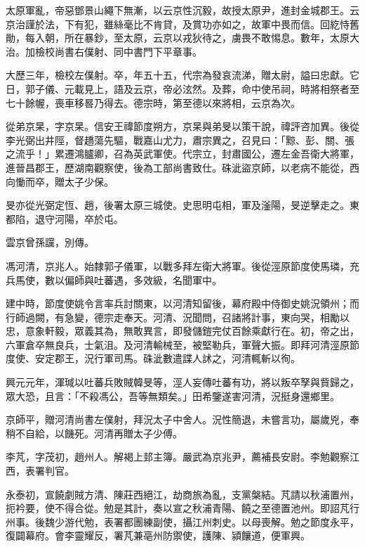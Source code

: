 \begin{pinyinscope}
 太原軍亂，帝惡鄧景山繩下無漸，以云京性沉毅，故授太原尹，進封金城郡王。云京治謹於法，下有犯，雖絲毫比不肯貸，及賞功亦如之，故軍中畏而信。回紇恃舊勛，每入朝，所在暴鈔，至太原，云京以戎狄待之，虜畏不敢惕息。數年，太原大治。加檢校尚書右僕射、同中書門下平章事。



 大歷三年，檢校左僕射。卒，年五十五，代宗為發哀流涕，贈太尉，謚曰忠獻。它日，郭子儀、元載見上，語及云京，帝必泫然。及葬，命中使吊祠，時將相祭者至七十餘幄，喪車移晷乃得去。德宗時，第至德以來將相，云京為次。



 從弟京杲，字京杲。信安王禕節度朔方，京杲與弟旻以策干說，禕評咨加異。後從李光弼出井陘，督趫蕩先驅，戰嘉山尤力，肅宗異之，召見曰：「黥、彭、關、張之流乎！」累遷鴻臚卿，召為英武軍使。代宗立，封肅國公，遷左金吾衛大將軍，進晉昌郡王，歷湖南觀察使，後為工部尚書致仕。硃泚盜京師，以老病不能從，西向慟而卒，贈太子少保。



 旻亦從光弼定恆、趙，後署太原三城使。史思明屯相，軍及滏陽，旻逆擊走之。東都陷，退守河陽，卒於屯。



 雲京曾孫讜，別傳。



 馮河清，京兆人。始隸郭子儀軍，以戰多拜左衛大將軍。後從涇原節度使馬璘，充兵馬使，數以偏師與吐蕃遇，多效級，名聞軍中。



 建中時，節度使姚令言率兵討關東，以河清知留後，幕府殿中侍御史姚況領州；而行師過闕，有急變，德宗走奉天。河清、況聞問，召諸將計事，東向哭，相勵以忠，意象軒毅，眾義其為，無敢異言，即發儲鎧完仗百餘乘獻行在。初，帝之出，六軍倉卒無良兵，士氣沮。及河清輸械至，被堅勒兵，軍聲大振。即拜河清涇原節度使、安定郡王，況行軍司馬。硃泚數遣諜人訹之，河清輒斬以徇。



 興元元年，渾瑊以吐蕃兵敗賊韓旻等，涇人妄傳吐蕃有功，將以叛卒孥與貲歸之，眾大恐，且言：「不殺馮公，吾等無類矣。」田希鑒遂害河清，況挺身還鄉里。



 京師平，贈河清尚書左僕射，拜況太子中舍人。況性簡退，未嘗言功，屬歲兇，奉稍不自給，以饑死。河清再贈太子少傅。



 李芃，字茂初，趙州人。解褐上邽主簿。嚴武為京兆尹，薦補長安尉。李勉觀察江西，表署判官。



 永泰初，宣饒劇賊方清、陳莊西絕江，劫商旅為亂，支黨槃結。芃請以秋浦置州，扼衿要，使不得合從。勉是其計，奏以宣之秋浦青陽、饒之至德置池州。即詔芃行州事。後魏少游代勉，表署都團練副使，攝江州刺史。以母喪解。勉之節度永平，復闢幕府。會李靈耀反，署芃兼亳州防禦使，護陳、潁饟道，便軍興。




\end{pinyinscope}

